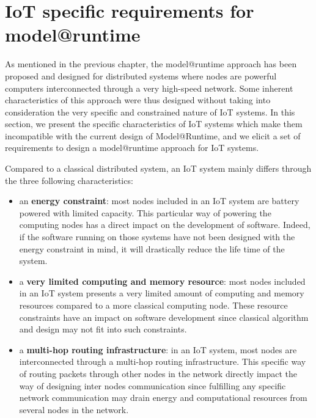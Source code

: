 \section{IoT specific requirements for model@runtime}
As mentioned in the previous chapter, the model@runtime approach has been proposed and designed for distributed systems where nodes are powerful computers interconnected through a very high-speed network. 
Some inherent characteristics of this approach were thus designed without taking into consideration the very specific and constrained nature of IoT systems.
In this section, we present the specific characteristics of IoT systems which make them incompatible with the current design of Model@Runtime, and we elicit a set of requirements to design a model@runtime approach for IoT systems.

Compared to a classical distributed system, an IoT system mainly differs through the three following characteristics:
\begin{itemize}
	\item an \textbf{energy constraint}: most nodes included in an IoT system are battery powered with limited capacity. This particular way of powering the computing nodes has a direct impact on the development of software. Indeed, if the software running on those systems have not been designed with the energy constraint in mind, it will drastically reduce the life time of the system.
	\item a \textbf{very limited computing and memory resource}: most nodes included in an IoT system presents a very limited amount of computing and memory resources compared to a more classical computing node. These resource constraints have an impact on software development since classical algorithm and design may not fit into such constraints.
	\item a \textbf{multi-hop routing infrastructure}: in an IoT system, most nodes are interconnected through a multi-hop routing infrastructure. This specific way of routing packets through other nodes in the network directly impact the way of designing inter nodes communication since fulfilling any specific network communication may drain energy and computational resources from several nodes in the network.
\end{itemize}

